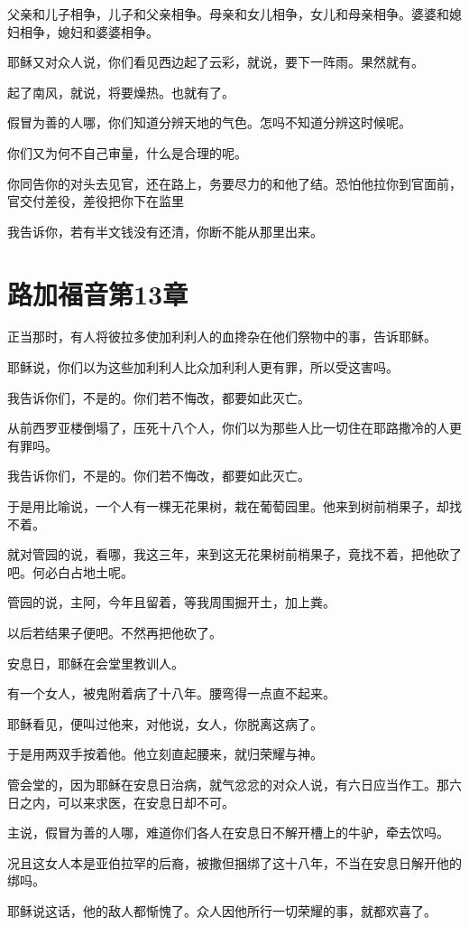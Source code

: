 \documentclass[12pt,oneside]{book}
\begin{document}
父亲和儿子相争，儿子和父亲相争。母亲和女儿相争，女儿和母亲相争。婆婆和媳妇相争，媳妇和婆婆相争。

耶稣又对众人说，你们看见西边起了云彩，就说，要下一阵雨。果然就有。

起了南风，就说，将要燥热。也就有了。

假冒为善的人哪，你们知道分辨天地的气色。怎吗不知道分辨这时候呢。

你们又为何不自己审量，什么是合理的呢。

你同告你的对头去见官，还在路上，务要尽力的和他了结。恐怕他拉你到官面前，官交付差役，差役把你下在监里

我告诉你，若有半文钱没有还清，你断不能从那里出来。

\chapter{路加福音第13章}
正当那时，有人将彼拉多使加利利人的血搀杂在他们祭物中的事，告诉耶稣。

耶稣说，你们以为这些加利利人比众加利利人更有罪，所以受这害吗。

我告诉你们，不是的。你们若不悔改，都要如此灭亡。

从前西罗亚楼倒塌了，压死十八个人，你们以为那些人比一切住在耶路撒冷的人更有罪吗。

我告诉你们，不是的。你们若不悔改，都要如此灭亡。

于是用比喻说，一个人有一棵无花果树，栽在葡萄园里。他来到树前梢果子，却找不着。

就对管园的说，看哪，我这三年，来到这无花果树前梢果子，竟找不着，把他砍了吧。何必白占地土呢。

管园的说，主阿，今年且留着，等我周围掘开土，加上粪。

以后若结果子便吧。不然再把他砍了。

安息日，耶稣在会堂里教训人。

有一个女人，被鬼附着病了十八年。腰弯得一点直不起来。

耶稣看见，便叫过他来，对他说，女人，你脱离这病了。

于是用两双手按着他。他立刻直起腰来，就归荣耀与神。

管会堂的，因为耶稣在安息日治病，就气忿忿的对众人说，有六日应当作工。那六日之内，可以来求医，在安息日却不可。

主说，假冒为善的人哪，难道你们各人在安息日不解开槽上的牛驴，牵去饮吗。

况且这女人本是亚伯拉罕的后裔，被撒但捆绑了这十八年，不当在安息日解开他的绑吗。

耶稣说这话，他的敌人都惭愧了。众人因他所行一切荣耀的事，就都欢喜了。
\end{document}
